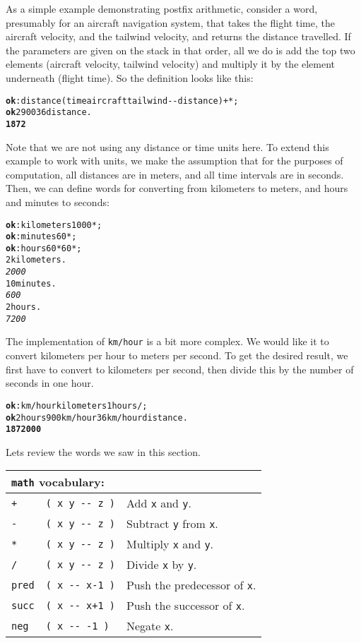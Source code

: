 \documentclass[english]{book}
\newcommand{\wordtable}[1]{{
\begin{tabularx}{12cm}{|l l X|}
#1
\hline
\end{tabularx}}}
\newcommand{\tabvocab}[1]{
\hline
\multicolumn{3}{|l|}{
\rule[-2mm]{0mm}{6mm}
\texttt{#1} vocabulary:}
\\
\hline
}
\begin{document}
As a simple example demonstrating postfix arithmetic, consider a word, presumably for an aircraft navigation system, that takes the flight time, the aircraft
velocity, and the tailwind velocity, and returns the distance travelled.
If the parameters are given on the stack in that order, all we do
is add the top two elements (aircraft velocity, tailwind velocity)
and multiply it by the element underneath (flight time). So the definition
looks like this:

\begin{alltt}
\textbf{ok} : distance ( time aircraft tailwind -{}- distance ) + {*} ;
\textbf{ok} 2 900 36 distance .
\textbf{1872}
\end{alltt}

Note that we are not using any distance or time units here. To extend this example to work with units, we make the assumption that for the purposes of computation, all distances are
in meters, and all time intervals are in seconds. Then, we can define words
for converting from kilometers to meters, and hours and minutes to
seconds:

\begin{alltt}
\textbf{ok} : kilometers 1000 {*} ;
\textbf{ok} : minutes 60 {*} ;
\textbf{ok} : hours 60 {*} 60 {*} ;
2 kilometers .
\emph{2000}
10 minutes .
\emph{600}
2 hours .
\emph{7200}
\end{alltt}

The implementation of \texttt{km/hour} is a bit more complex. We would like it to convert kilometers per hour to meters per second. To get the desired result, we first have to convert to kilometers per second, then divide this by the number of seconds in one hour.

\begin{alltt}
\textbf{ok} : km/hour kilometers 1 hours / ;
\textbf{ok} 2 hours 900 km/hour 36 km/hour distance .
\textbf{1872000}
\end{alltt}

Lets review the words we saw in this section.

\wordtable{
\tabvocab{math}
\texttt{+}&
\texttt{( x y -{}- z )}&
Add \texttt{x} and \texttt{y}.\\
\texttt{-}&
\texttt{( x y -{}- z )}&
Subtract \texttt{y} from \texttt{x}.\\
\texttt{*}&
\texttt{( x y -{}- z )}&
Multiply \texttt{x} and \texttt{y}.\\
\texttt{/}&
\texttt{( x y -{}- z )}&
Divide \texttt{x} by \texttt{y}.\\
\texttt{pred}&
\texttt{( x -{}- x-1 )}&
Push the predecessor of \texttt{x}.\\
\texttt{succ}&
\texttt{( x -{}- x+1 )}&
Push the successor of \texttt{x}.\\
\texttt{neg}&
\texttt{( x -{}- -1 )}&
Negate \texttt{x}.\\
}
\end{document}
